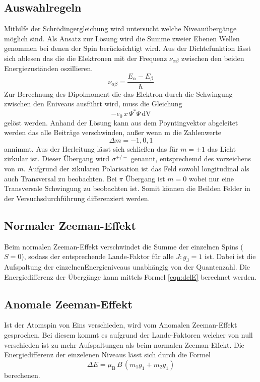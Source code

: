 \subsection{Auswahlregeln}
Mithilfe der Schrödingergleichung wird untersucht welche Niveauübergänge möglich sind. Als Ansatz zur Lösung wird die Summe zweier Ebenen Wellen genommen bei denen der Spin berücksichtigt wird. Aus der Dichtefunktion lässt sich ablesen das die die Elektronen mit der Frequenz $\nu_{\alpha\beta}$ zwischen den beiden Energiezuständen oszillieren.
\begin{equation}
  \nu_{\alpha\beta}= \frac{E_{\alpha} - E_{\beta}}{\hbar}
  \label{eqn:nu}
\end{equation}
Zur Berechnung des Dipolmoment die das Elektron durch die Schwingung zwischen den Eniveaus ausführt wird, muss die Gleichung
\begin{equation}
  -e_0\, x \, \Psi^* \Psi \, \text{dV}
  \label{}
\end{equation}
gelöst werden. Anhand der Lösung kann aus dem Poyntingvektor abgeleitet werden das alle Beiträge verschwinden, außer wenn m die Zahlenwerte
\begin{equation}
  \Delta m = -1,0,1
\end{equation}
annimmt. Aus der Herleitung lässt sich schließen das für $m = \pm 1$ das Licht zirkular ist. Dieser Übergang wird $\sigma^{+/-}$ genannt, entsprechemd des vorzeichens von $m$. Aufgrund der zikularen Polarisation ist das Feld sowohl longitudinal als auch Transversal zu beobachten. Bei $\pi$ Übergang ist $m = 0$ wobei nur eine Transversale Schwingung zu beobachten ist. Somit können die Beilden Felder in der Versuchsdurchführung differenziert werden.

\subsection{Normaler Zeeman-Effekt}
Beim normalen Zeeman-Effekt verschwindet die Summe der einzelnen Spins ($S=0$), sodass der entsprechende Lande-Faktor für alle $J : g_\text{J} = 1$ ist. Dabei ist die Aufspaltung der einzelnenEnergieniveaus unabhängig von der Quantenzahl. Die Energiedifferenz der Übergänge kann mittels Formel \ref{eqn:delE} berechnet werden.
\subsection{Anomale Zeeman-Effekt}
Ist der Atomspin von Eins verschieden, wird vom Anomalen Zeeman-Effekt gesprochen. Bei diesem kommt es aufgrund der Lande-Faktoren welcher von null verschieden ist zu mehr Aufspaltungen als beim normalen Zeeman-Effekt. Die Energiedifferenz der einzelenen Niveaus lässt sich durch die Formel
\begin{equation}
  \Delta E = \mu_\text{B}\,B\,(m_1 g_1 + m_2 g_1)
  \label{eqn:dE}
\end{equation}
berechenen.

